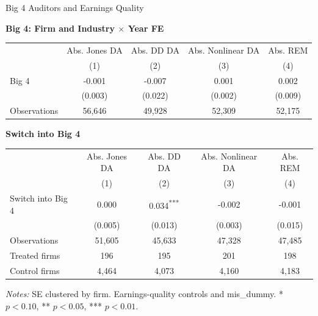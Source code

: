 \documentclass[10pt]{article}
\newcommand{\sym}[1]{\textsuperscript{#1}}
\begin{document}
\fontsize{10}{12}\selectfont
\setlength{\tabcolsep}{3pt}\renewcommand{\arraystretch}{1.15}
\begin{center}\large Big 4 Auditors and Earnings Quality\end{center}
\medskip\textbf{Big 4: Firm and Industry $\times$ Year FE}\par\smallskip
\begin{tabular*}{\textwidth}{@{\extracolsep{\fill}}lcccc@{}}
\toprule
 & Abs. Jones DA & Abs. DD DA & Abs. Nonlinear DA & Abs. REM \\
 & (1) & (2) & (3) & (4) \\
\midrule
Big 4 & -0.001 & -0.007 & 0.001 & 0.002 \\
 & (0.003) & (0.022) & (0.002) & (0.009) \\
Observations & 56,646 & 49,928 & 52,309 & 52,175 \\
\bottomrule\end{tabular*}\par
\medskip\textbf{Switch into Big 4}\par\smallskip
\begin{tabular*}{\textwidth}{@{\extracolsep{\fill}}lcccc@{}}
\toprule
 & Abs. Jones DA & Abs. DD DA & Abs. Nonlinear DA & Abs. REM \\
 & (1) & (2) & (3) & (4) \\
\midrule
Switch into Big 4 & 0.000 & 0.034\sym{***} & -0.002 & -0.001 \\
 & (0.005) & (0.013) & (0.003) & (0.015) \\
Observations & 51,605 & 45,633 & 47,328 & 47,485 \\
Treated firms & 196 & 195 & 201 & 198 \\
Control firms & 4,464 & 4,073 & 4,160 & 4,183 \\
\bottomrule\end{tabular*}\par
\medskip\fontsize{9}{11}\selectfont\textit{Notes:} SE clustered by firm. Earnings-quality controls and mis\_dummy. * $p<0.10$, ** $p<0.05$, *** $p<0.01$.
\end{document}
